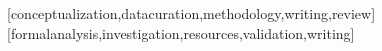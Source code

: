 \documentclass[english]{textolivre}
\begin{document}
\printbibliography\label{sec-bib}
\begin{contributors}
[conceptualization,datacuration,methodology,writing,review]
[formalanalysis,investigation,resources,validation,writing]
\end{contributors}
\end{document}

